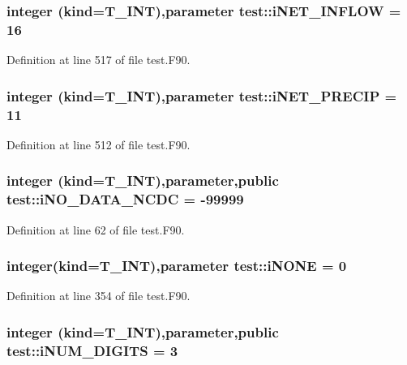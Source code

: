 \hypertarget{namespacetest_afafe0185b588b6c2503ad2cdfaccd5a7}{
\subsubsection[{iNET\_\-INFLOW}]{\setlength{\rightskip}{0pt plus 5cm}integer (kind={\bf T\_\-INT}),parameter {\bf test::iNET\_\-INFLOW} = 16}}
\label{namespacetest_afafe0185b588b6c2503ad2cdfaccd5a7}


Definition at line 517 of file test.F90.

\hypertarget{namespacetest_aa863a0c7e87979b7d13b34f5afb7ecf5}{
\subsubsection[{iNET\_\-PRECIP}]{\setlength{\rightskip}{0pt plus 5cm}integer (kind={\bf T\_\-INT}),parameter {\bf test::iNET\_\-PRECIP} = 11}}
\label{namespacetest_aa863a0c7e87979b7d13b34f5afb7ecf5}


Definition at line 512 of file test.F90.

\hypertarget{namespacetest_a751d31358c9620f1549f1428a6a12835}{
\subsubsection[{iNO\_\-DATA\_\-NCDC}]{\setlength{\rightskip}{0pt plus 5cm}integer (kind={\bf T\_\-INT}),parameter,public {\bf test::iNO\_\-DATA\_\-NCDC} = -\/99999}}
\label{namespacetest_a751d31358c9620f1549f1428a6a12835}


Definition at line 62 of file test.F90.

\hypertarget{namespacetest_a1f50531cf0fa6afcb5cea12a45a90947}{
\subsubsection[{iNONE}]{\setlength{\rightskip}{0pt plus 5cm}integer(kind={\bf T\_\-INT}),parameter {\bf test::iNONE} = 0}}
\label{namespacetest_a1f50531cf0fa6afcb5cea12a45a90947}


Definition at line 354 of file test.F90.

\hypertarget{namespacetest_a9f880ad69dfceb22317f4bd514f70921}{
\subsubsection[{iNUM\_\-DIGITS}]{\setlength{\rightskip}{0pt plus 5cm}integer (kind={\bf T\_\-INT}),parameter,public {\bf test::iNUM\_\-DIGITS} = 3}}
\label{namespacetest_a9f880ad69dfceb22317f4bd514f70921}


